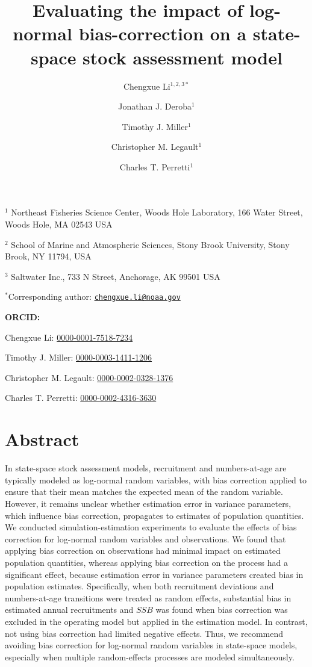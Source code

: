 \documentclass[
  12pt,
]{article}
\title{Evaluating the impact of log-normal bias-correction on a
state-space stock assessment model}
\author{Chengxue Li\(^{1,2,3*}\) \and Jonathan J.
Deroba\(^1\) \and Timothy J. Miller\(^1\) \and Christopher M.
Legault\(^1\) \and Charles T. Perretti\(^1\)}
\date{}
\begin{document}
\maketitle

\(^1\) Northeast Fisheries Science Center, Woods Hole Laboratory, 166
Water Street, Woods Hole, MA 02543 USA

\(^2\) School of Marine and Atmospheric Sciences, Stony Brook
University, Stony Brook, NY 11794, USA

\(^3\) Saltwater Inc., 733 N Street, Anchorage, AK 99501 USA

\(^*\)Corresponding author:
\href{mailto:chengxue.li@noaa.gov}{\nolinkurl{chengxue.li@noaa.gov}}

\vspace{0.5cm}

\textbf{ORCID:}

Chengxue Li:
\href{https://orcid.org/0000-0001-7518-7234}{0000-0001-7518-7234}

Timothy J. Miller:
\href{https://orcid.org/0000-0003-1411-1206}{0000-0003-1411-1206}

Christopher M. Legault:
\href{https://orcid.org/0000-0002-0328-1376}{0000-0002-0328-1376}

Charles T. Perretti:
\href{https://orcid.org/0000-0002-4316-3630}{0000-0002-4316-3630}

\pagebreak

\hypertarget{abstract}{%
\section*{Abstract}\label{abstract}}

In state-space stock assessment models, recruitment and numbers-at-age
are typically modeled as log-normal random variables, with bias
correction applied to ensure that their mean matches the expected mean
of the random variable. However, it remains unclear whether estimation
error in variance parameters, which influence bias correction,
propagates to estimates of population quantities. We conducted
simulation-estimation experiments to evaluate the effects of bias
correction for log-normal random variables and observations. We found
that applying bias correction on observations had minimal impact on
estimated population quantities, whereas applying bias correction on the
process had a significant effect, because estimation error in variance
parameters created bias in population estimates. Specifically, when both
recruitment deviations and numbers-at-age transitions were treated as
random effects, substantial bias in estimated annual recruitments and
\(SSB\) was found when bias correction was excluded in the operating
model but applied in the estimation model. In contrast, not using bias
correction had limited negative effects. Thus, we recommend avoiding
bias correction for log-normal random variables in state-space models,
especially when multiple random-effects processes are modeled
simultaneously.
\end{document}
